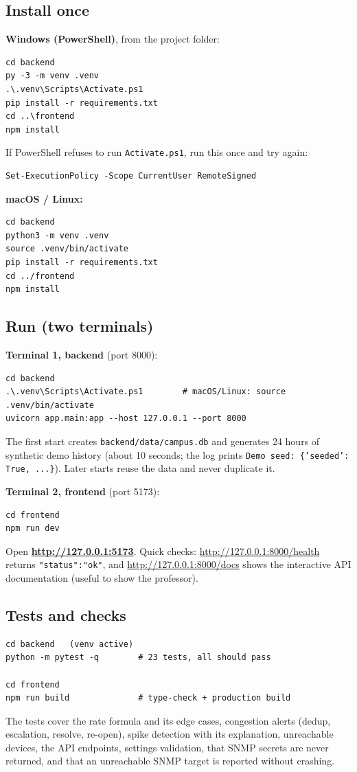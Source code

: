 \documentclass[11pt,a4paper]{article}
\newcommand{\code}[1]{\texttt{#1}}
\newcommand{\file}[1]{\texttt{\color{ink}#1}}
\begin{document}
\subsection{Install once}

\textbf{Windows (PowerShell)}, from the project folder:
\begin{lstlisting}
cd backend
py -3 -m venv .venv
.\.venv\Scripts\Activate.ps1
pip install -r requirements.txt
cd ..\frontend
npm install
\end{lstlisting}
If PowerShell refuses to run \code{Activate.ps1}, run this once and try again:
\begin{lstlisting}
Set-ExecutionPolicy -Scope CurrentUser RemoteSigned
\end{lstlisting}

\textbf{macOS / Linux:}
\begin{lstlisting}
cd backend
python3 -m venv .venv
source .venv/bin/activate
pip install -r requirements.txt
cd ../frontend
npm install
\end{lstlisting}

\subsection{Run (two terminals)}

\textbf{Terminal 1, backend} (port 8000):
\begin{lstlisting}
cd backend
.\.venv\Scripts\Activate.ps1        # macOS/Linux: source .venv/bin/activate
uvicorn app.main:app --host 127.0.0.1 --port 8000
\end{lstlisting}
The first start creates \file{backend/data/campus.db} and generates 24 hours of synthetic demo history (about 10 seconds; the log
prints \code{Demo seed: \{'seeded': True, ...\}}). Later starts reuse the data and never duplicate it.

\textbf{Terminal 2, frontend} (port 5173):
\begin{lstlisting}
cd frontend
npm run dev
\end{lstlisting}
Open \textbf{\url{http://127.0.0.1:5173}}. Quick checks: \url{http://127.0.0.1:8000/health} returns \code{"status":"ok"}, and
\url{http://127.0.0.1:8000/docs} shows the interactive API documentation (useful to show the professor).

\subsection{Tests and checks}
\begin{lstlisting}
cd backend   (venv active)
python -m pytest -q        # 23 tests, all should pass

cd frontend
npm run build              # type-check + production build
\end{lstlisting}
The tests cover the rate formula and its edge cases, congestion alerts (dedup, escalation, resolve, re-open), spike detection with
its explanation, unreachable devices, the API endpoints, settings validation, that SNMP secrets are never returned, and that an
unreachable SNMP target is reported without crashing.
\end{document}
